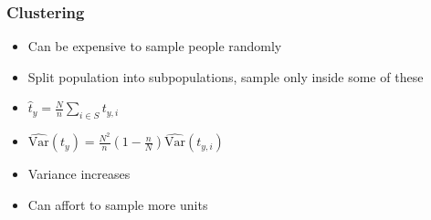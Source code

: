 \documentclass{beamer}
\begin{document}
\begin{frame}
  \frametitle{Clustering}

  \begin{itemize}
  \addtolength{\itemsep}{0.5\baselineskip}
  \item Can be expensive to sample people randomly
  \item Split population into subpopulations, sample only inside some of these
  \item \(\hat{t}_y = \frac{N}{n} \sum_{i \in S} t_{y, i} \) %
  \item \(\widehat{\mathrm{Var}}\left(t_{y}\right) = \frac{N^2}{n} \left( 1 - \frac{n}{N}
\right) \widehat{\mathrm{Var}}\left( t_{y, i} \right)\)
  \item Variance increases
  \item Can affort to sample more units %
  \end{itemize}
  
\end{frame}
\end{document}
